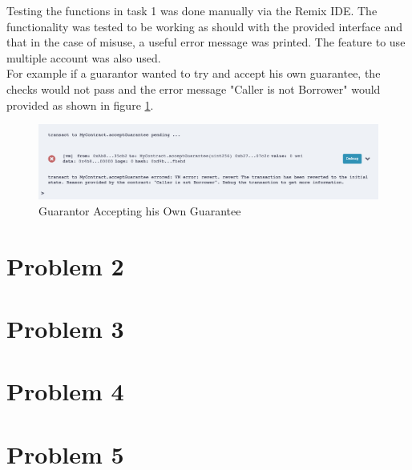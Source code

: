 \documentclass[a4paper, 12pt]{article}
\begin{document}
Testing the functions in task 1 was done manually via the Remix IDE. The functionality was tested to be working as should with the provided interface and that in the case of misuse, a useful error message was printed. The feature to use multiple account was also used.
\\
For example if a guarantor wanted to try and accept his own guarantee, the checks would not pass and the error message "Caller is not Borrower" would provided as shown in figure \ref{fig:error}.

\begin{figure}[h!]
	\centering
	\includegraphics[width=\textwidth]{./Images/error}
	\caption{Guarantor Accepting his Own Guarantee}
	\label{fig:error}
\end{figure}


\section{Problem 2}
\section{Problem 3}
\section{Problem 4}
\section{Problem 5}

%
\end{document}
